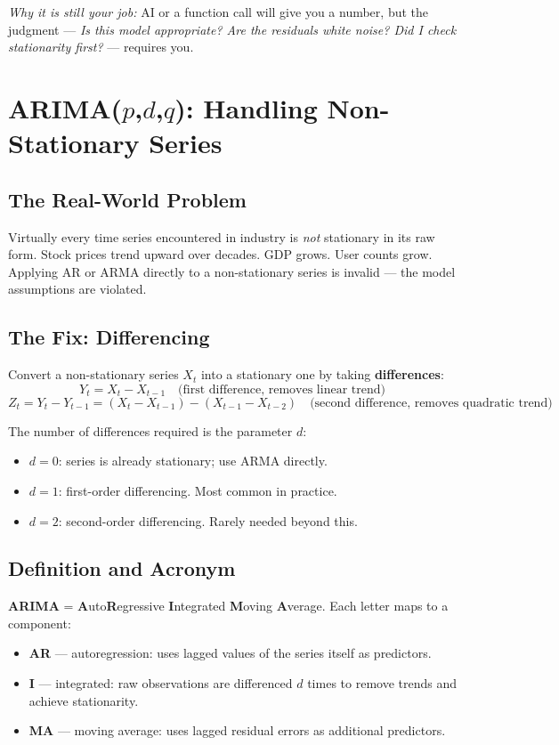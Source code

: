 \documentclass[11pt]{article}
\begin{document}
\textit{Why it is still your job:} AI or a function call will give you a
number, but the judgment --- \textit{Is this model appropriate? Are the
residuals white noise? Did I check stationarity first?} --- requires you.


\section{ARIMA($p$,$d$,$q$): Handling Non-Stationary Series}

\subsection{The Real-World Problem}
Virtually every time series encountered in industry is \emph{not} stationary
in its raw form. Stock prices trend upward over decades. GDP grows. User counts
grow. Applying AR or ARMA directly to a non-stationary series is invalid ---
the model assumptions are violated.

\subsection{The Fix: Differencing}
Convert a non-stationary series $X_t$ into a stationary one by taking
\textbf{differences}:
\[
Y_t = X_t - X_{t-1} \quad \text{(first difference, removes linear trend)}
\]
\[
Z_t = Y_t - Y_{t-1} = (X_t - X_{t-1}) - (X_{t-1} - X_{t-2})
\quad \text{(second difference, removes quadratic trend)}
\]

The number of differences required is the parameter $d$:
\begin{itemize}
    \item $d = 0$: series is already stationary; use ARMA directly.
    \item $d = 1$: first-order differencing. Most common in practice.
    \item $d = 2$: second-order differencing. Rarely needed beyond this.
\end{itemize}

\subsection{Definition and Acronym}
\textbf{ARIMA} = \textbf{A}uto\textbf{R}egressive \textbf{I}ntegrated
\textbf{M}oving \textbf{A}verage. Each letter maps to a component:

\begin{itemize}
    \item \textbf{AR} --- autoregression: uses lagged values of the series
      itself as predictors.
    \item \textbf{I} --- integrated: raw observations are differenced
      $d$ times to remove trends and achieve stationarity.
    \item \textbf{MA} --- moving average: uses lagged residual errors as
      additional predictors.
\end{itemize}
\end{document}
